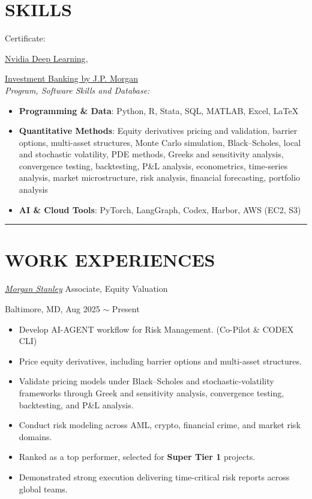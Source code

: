 \documentclass[10pt]{res} %
\begin{document}
\begin{resume}
\section{\color{Par}\LARGE S\large KILLS}
\vspace{0.1in}
{Certificate:}
{\href{https://learn.nvidia.com/certificates?id=cyZTSpvuTByKoMtWoT-OAw}{Nvidia Deep Learning},
{\href{https://www.credly.com/badges/882e21ff-7761-4e54-bf35-812b0fcf45f3/linked_in_profile}{Investment Banking by J.P. Morgan} 
\\
{\large\itshape Program, Software Skills and Database:}
\begin{itemize} \itemsep -2pt
  \item {\textbf{Programming \& Data}}: Python, R, Stata, SQL, MATLAB, Excel, \LaTeX
  \item {\textbf{Quantitative Methods}}: Equity derivatives pricing and validation, barrier options, multi-asset structures, Monte Carlo simulation, Black--Scholes, local and stochastic volatility, PDE methods, Greeks and sensitivity analysis, convergence testing, backtesting, P\&L analysis, econometrics, time-series analysis, market microstructure, risk analysis, financial forecasting, portfolio analysis
  \item {\textbf{AI \& Cloud Tools}}: PyTorch, LangGraph, Codex, Harbor, AWS (EC2, S3)
 \end{itemize}
\noindent\rule{\textwidth}{0.01pt}
\section{\color{Par} \LARGE W\large ORK EXPERIENCES}

\href{https://www.morganstanley.com/about-us/global-offices/baltimore}{\itshape Morgan Stanley} \color{Par} Associate, Equity Valuation} 
\hfill Baltimore, MD, Aug 2025 $\sim$ Present
\vspace{0.05in}
   \begin{itemize} \itemsep -2pt  %
   \item Develop AI-AGENT workflow for Risk Management. (Co-Pilot \& CODEX CLI)
   \item Price equity derivatives, including barrier options and multi-asset structures.
   \item Validate pricing models under Black--Scholes and stochastic-volatility frameworks through Greek and sensitivity analysis, convergence testing, backtesting, and P\&L analysis.
   \item Conduct risk modeling across AML, crypto, financial crime, and market risk domains.
   \item Ranked as a top performer, selected for \textbf{Super Tier 1} projects.
   \item Demonstrated strong execution delivering time-critical risk reports across global teams.
\end{itemize}


}
\end{resume}
\end{document}

